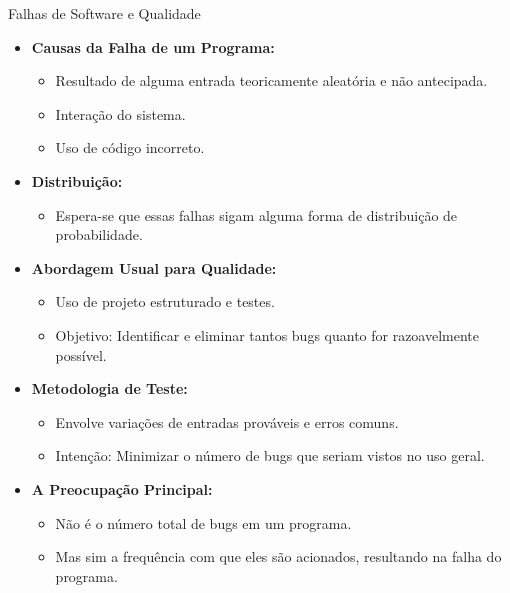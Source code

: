 \begin{frame}{Falhas de Software e Qualidade}
    \begin{itemize}
        \item \textbf{Causas da Falha de um Programa:}
              \begin{itemize}
                  \item Resultado de alguma entrada teoricamente aleatória e não antecipada.
                  \item Interação do sistema.
                  \item Uso de código incorreto.
              \end{itemize}

        \item \textbf{Distribuição:}
              \begin{itemize}
                  \item Espera-se que essas falhas sigam alguma forma de distribuição de probabilidade.
              \end{itemize}

        \item \textbf{Abordagem Usual para Qualidade:}
              \begin{itemize}
                  \item Uso de projeto estruturado e testes.
                  \item Objetivo: Identificar e eliminar tantos bugs quanto for razoavelmente possível.
              \end{itemize}

        \item \textbf{Metodologia de Teste:}
              \begin{itemize}
                  \item Envolve variações de entradas prováveis e erros comuns.
                  \item Intenção: Minimizar o número de bugs que seriam vistos no uso geral.
              \end{itemize}

        \item \textbf{A Preocupação Principal:}
              \begin{itemize}
                  \item Não é o número total de bugs em um programa.
                  \item Mas sim a frequência com que eles são acionados, resultando na falha do programa.
              \end{itemize}
    \end{itemize}
\end{frame}

